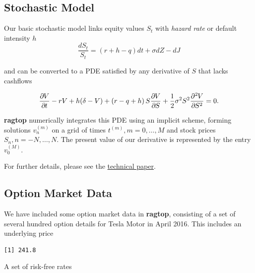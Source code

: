 \documentclass[]{article}
\newenvironment{Shaded}{\begin{snugshade}}{\end{snugshade}}
\newcommand{\DataTypeTok}[1]{\textcolor[rgb]{0.13,0.29,0.53}{#1}}
\newcommand{\DecValTok}[1]{\textcolor[rgb]{0.00,0.00,0.81}{#1}}
\newcommand{\KeywordTok}[1]{\textcolor[rgb]{0.13,0.29,0.53}{\textbf{#1}}}
\newcommand{\NormalTok}[1]{#1}
\newcommand{\OperatorTok}[1]{\textcolor[rgb]{0.81,0.36,0.00}{\textbf{#1}}}
\begin{document}
\hypertarget{stochastic-model}{%
\subsection{Stochastic Model}\label{stochastic-model}}

Our basic stochastic model links equity values \(S_t\) with \emph{hazard
rate} or default intensity \(h\) \[
    \frac{dS_t}{S_t}=(r+h-q) dt + \sigma dZ - dJ
\]

and can be converted to a PDE satisfied by any derivative of \(S\) that
lacks cashflows

\[
{{\frac{\partial \mspace{-1.0mu} V}{\partial \mspace{-1.0mu} t}}} -rV + h(\delta-V) + \left(r-q+h\right)S{{\frac{\partial \mspace{-1.0mu} V}{\partial \mspace{-1.0mu} S}}}+\frac12 \sigma^2 S^2 {{\frac{\partial^2 \mspace{-1.0mu} V}{\partial \mspace{-1.0mu} S^2}}}=0.
\]

\textbf{ragtop} numerically integrates this PDE using an implicit
scheme, forming solutions \(v^{(m)}_n\) on a grid of times
\(t^{(m)}, m=0,\dots,M\) and stock prices \(S_n, n=-N,\dots,N\). The
present value of our derivative is represented by the entry
\(v^{(M)}_0\).

For further details, please see the
\href{http://thureoscapital.com/ragtop.pdf}{technical paper}.

\hypertarget{option-market-data}{%
\subsection{Option Market Data}\label{option-market-data}}

We have included some option market data in \textbf{ragtop}, consisting
of a set of several hundred option details for Tesla Motor in April
2016. This includes an underlying price

\begin{Shaded}
\end{Shaded}

\begin{verbatim}
[1] 241.8
\end{verbatim}

A set of risk-free rates

\begin{Shaded}
\end{Shaded}
\end{document}

